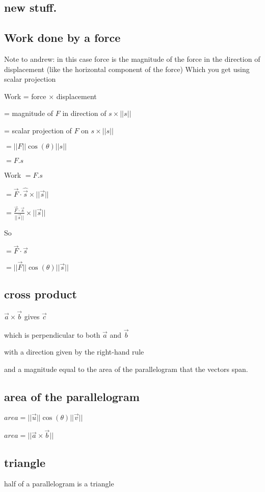\documentclass{extarticle}
\begin{document}
\begin{multicols}{2}
\section{new stuff.}

\subsection{Work done by a force}


Note to andrew: in this case force is the magnitude of the force in the direction of displacement (like the horizontal component of the force) Which you get using scalar projection


Work = force $\times$ displacement

= magnitude of $F$ in direction of $s \times ||s||$

= scalar projection of $F$ on $s \times ||s||$

$= ||F||\cos{(\theta)}||s||$

$= F.s$

Work $= F.s$


$=\vec{F} \cdot \hat{\vec{s}} \times ||\vec{s}||$

$=\frac{\vec{F} \cdot \vec{s}}{||\vec{s}||} \times ||\vec{s}||$

So

$=\vec{F} \cdot \vec{s}$

$= ||\vec{F}||\cos(\theta)||\vec{s}||$


\subsection{cross product}
$\vec{a}\times \vec{b}$ gives $\vec{c}$

which is perpendicular to both $\vec{a}$ and $\vec{b}$

with a direction given by the right-hand rule

and a magnitude equal to the area of the parallelogram that the vectors span.

\subsection{area of the parallelogram}
$area =||\vec{u}||\cos{(\theta)}||\vec{v}||$

$area =||\vec{a}\times \vec{b}||$
\subsection{triangle}
half of a parallelogram is a triangle


\end{multicols}
\end{document}
